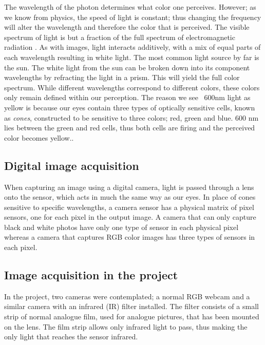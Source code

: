 The wavelength of the photon determines what color one perceives. However; as we know from physics, the speed of light is constant; thus changing the frequency will alter the wavelength and therefore the color that is perceived. The visible spectrum of light is but a fraction of the full spectrum of electromagnetic radiation . As with images, light interacts additively, with a mix of equal parts of each wavelength resulting in white light.
The most common light source by far is the sun. The white light from the sun can be broken down into its component wavelengths by refracting the light in a prism. This will yield the full color spectrum.
While different wavelengths correspond to different colors, these colors only remain defined within our perception. The reason we see ~600nm light as yellow is because our eyes contain three types of optically sensitive cells, known as \textit{cones}, constructed to be sensitive to three colors; red, green and blue. 600 nm lies between the green and red cells, thus both cells are firing and the perceived color becomes yellow.\citep{perception_book}.
\subsection{Digital image acquisition}
When capturing an image using a digital camera, light is passed through a lens onto the sensor, which acts in much the same way as our eyes. In place of cones sensitive to specific wavelengths, a camera sensor has a physical matrix of pixel sensors, one for each pixel in the output image. A camera that can only capture black and white photos have only one type of sensor in each physical pixel whereas a camera that captures RGB color images has three types of sensors in each pixel. 
\subsection{Image acquisition in the project}
In the project, two cameras were contemplated; a normal RGB webcam and a similar camera with an infrared (IR) filter installed. The filter consists of a small strip of normal analogue film, used for analogue pictures, that has been mounted on the lens. The film strip allows only infrared light to pass, thus making the only light that reaches the sensor infrared. 

